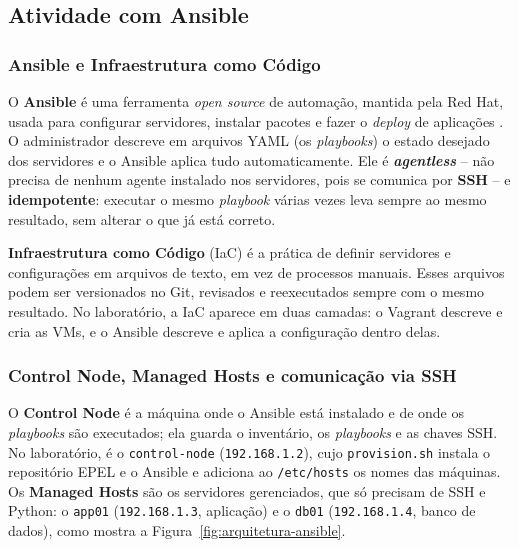 \subsection{Atividade com Ansible}\label{sec:ansible}

\subsubsection{Ansible e Infraestrutura como Código}

O \textbf{Ansible} é uma ferramenta \textit{open source} de automação, mantida pela Red Hat, usada
para configurar servidores, instalar pacotes e fazer o \textit{deploy} de aplicações
\citep{redhat2026}. O administrador descreve em arquivos YAML (os \textit{playbooks}) o estado
desejado dos servidores e o Ansible aplica tudo automaticamente. Ele é \textbf{\textit{agentless}}
-- não precisa de nenhum agente instalado nos servidores, pois se comunica por \textbf{SSH} -- e
\textbf{idempotente}: executar o mesmo \textit{playbook} várias vezes leva sempre ao mesmo resultado,
sem alterar o que já está correto.

\textbf{Infraestrutura como Código} (IaC) é a prática de definir servidores e configurações em
arquivos de texto, em vez de processos manuais. Esses arquivos podem ser versionados no Git, revisados
e reexecutados sempre com o mesmo resultado. No laboratório, a IaC aparece em duas camadas: o
Vagrant descreve e cria as VMs, e o Ansible descreve e aplica a configuração dentro delas.

\subsubsection{Control Node, Managed Hosts e comunicação via SSH}

O \textbf{Control Node} é a máquina onde o Ansible está instalado e de onde os \textit{playbooks}
são executados; ela guarda o inventário, os \textit{playbooks} e as chaves SSH. No laboratório, é o
\texttt{control-node} (\texttt{192.168.1.2}), cujo \texttt{provision.sh} instala o repositório EPEL
e o Ansible e adiciona ao \texttt{/etc/hosts} os nomes das máquinas. Os \textbf{Managed Hosts} são os
servidores gerenciados, que só precisam de SSH e Python: o \texttt{app01} (\texttt{192.168.1.3},
aplicação) e o \texttt{db01} (\texttt{192.168.1.4}, banco de dados), como mostra a
Figura~\ref{fig:arquitetura-ansible}.

